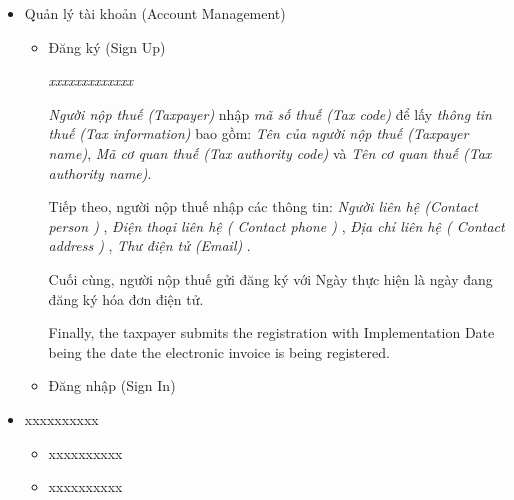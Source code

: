 \begin{itemize}

\item Quản lý tài khoản (Account Management)

\begin{itemize}

\item Đăng ký (Sign Up)

\emph{xxxxxxxxxxxxx}

\emph{Người nộp thuế (Taxpayer)} nhập \emph{mã số thuế (Tax code)} để lấy \emph{thông tin thuế (Tax information)} bao gồm: \emph{Tên của người nộp thuế (Taxpayer name)}, \emph{Mã cơ quan thuế (Tax authority code) }       và \emph{Tên cơ quan thuế (Tax authority name)}.

Tiếp theo, người nộp thuế nhập các thông tin: \emph{ Người liên hệ (Contact person ) }  , \emph{Điện thoại liên hệ  ( Contact phone )}   ,  \emph{ Địa chỉ liên hệ  ( Contact address )}  ,  \emph{  Thư điện tử  (Email)  }.

Cuối cùng, người nộp thuế gửi đăng ký với Ngày thực hiện là ngày đang đăng ký hóa đơn điện tử.


Finally, the taxpayer submits the registration with Implementation Date being the date the electronic invoice is being registered.

\item Đăng nhập (Sign In)


\end{itemize}

\item xxxxxxxxxx

\begin{itemize}

\item xxxxxxxxxx

\item xxxxxxxxxx

\end{itemize}

\end{itemize}




